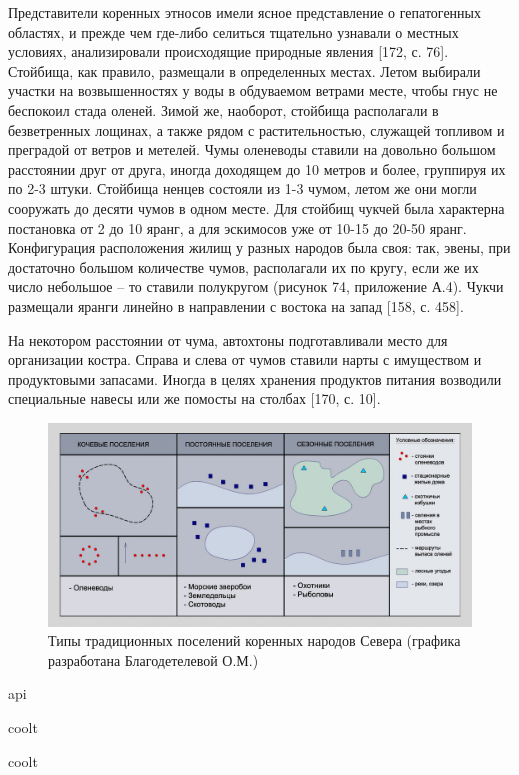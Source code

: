 Представители коренных этносов имели ясное представление о гепатогенных областях, и прежде чем где-либо селиться тщательно узнавали о местных условиях,
анализировали происходящие природные явления [172, с. 76]. Стойбища, как правило, размещали в определенных местах.
Летом выбирали участки на возвышенностях у воды в обдуваемом ветрами месте, чтобы гнус не беспокоил стада оленей.
Зимой же, наоборот, стойбища располагали в безветренных лощинах, а также рядом с растительностью, служащей топливом и преградой от ветров и метелей.
Чумы оленеводы ставили на довольно большом расстоянии друг от друга, иногда доходящем до 10 метров и более, группируя их по 2-3 штуки.
Стойбища ненцев состояли из 1-3 чумом, летом же они могли сооружать до десяти чумов в одном месте. Для стойбищ чукчей была характерна постановка от 2 до 10 яранг, а для эскимосов уже от 10-15 до 20-50 яранг.
Конфигурация расположения жилищ у разных народов была своя: так, эвены, при достаточно большом количестве чумов, располагали их по кругу, если же их число небольшое – то ставили полукругом (рисунок 74, приложение А.4). Чукчи размещали яранги линейно в направлении с востока на запад [158, с. 458].

На некотором расстоянии от чума, автохтоны подготавливали место для организации костра. Справа и слева от чумов ставили нарты с имуществом и продуктовыми запасами.
Иногда в целях хранения продуктов питания возводили специальные навесы или же помосты на столбах [170, с. 10].

\begin{figure}
    \centering
    \includegraphics[width=\textwidth]{assets/figures/ch01_s10_urbanplan_settelsystems03}
    \caption{Типы традиционных поселений коренных народов Севера (графика разработана Благодетелевой О.М.)}
    \author{графика разработана Благодетелевой О.М.}
    \label{fig:ch01_s10_urbanplan_settelsystems03}
  \end{figure}

\gls{api}


\gls{coolt}

\gls{coolt}
